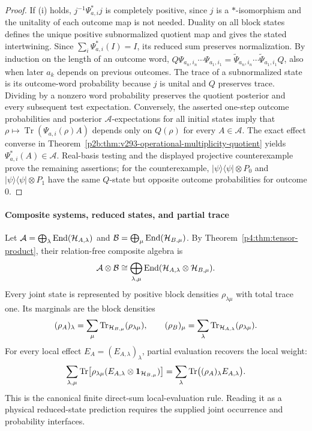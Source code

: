 \documentclass[12pt,a4paper]{article}
\begin{document}
\begin{proof}
If (i) holds, $j^{-1}\Psi_{a,i}^*j$ is completely positive, since
$j$ is a $*$-isomorphism and the unitality of each outcome map is not
needed. Duality on all block states defines the unique positive
subnormalized quotient map and gives the stated intertwining. Since
$\sum_i\Psi_{a,i}^*(I)=I$, its reduced sum preserves normalization.
By induction on the length of an outcome word,
$Q\Psi_{a_n,i_n}\cdots\Psi_{a_1,i_1}
=\widetilde\Psi_{a_n,i_n}\cdots\widetilde\Psi_{a_1,i_1}Q$,
also when later $a_k$ depends on previous outcomes. The trace of a
subnormalized state is its outcome-word probability because $j$ is
unital and $Q$ preserves trace. Dividing by a nonzero word probability
preserves the quotient posterior and every subsequent test expectation.
Conversely, the asserted one-step outcome probabilities and posterior
$\mathcal A$-expectations for all initial states imply that
$\rho\mapsto\operatorname{Tr}(\Psi_{a,i}(\rho)A)$ depends only on
$Q(\rho)$ for every $A\in\mathcal A$. The exact effect converse in
Theorem~\ref{p2b:thm:v293-operational-multiplicity-quotient} yields
$\Psi_{a,i}^*(A)\in\mathcal A$. Real-basis testing and the displayed
projective counterexample prove the remaining assertions; for the
counterexample, $|\psi\rangle\langle\psi|\otimes P_0$ and
$|\psi\rangle\langle\psi|\otimes P_1$ have the same $Q$-state but
opposite outcome probabilities for outcome $0$.
\end{proof}



\paragraph{Composite systems, reduced states, and partial trace}
\label{p4:sec:part1-partial-trace}

Let
\(\mathcal A=\bigoplus_\lambda\operatorname{End}(\mathcal H_{A,\lambda})\) and
\(\mathcal B=\bigoplus_\mu\operatorname{End}(\mathcal H_{B,\mu})\).  By
Theorem~\ref{p4:thm:tensor-product}, their relation-free composite algebra is
\[
\mathcal A\otimes\mathcal B
\cong
\bigoplus_{\lambda,\mu}
\operatorname{End}(\mathcal H_{A,\lambda}\otimes\mathcal H_{B,\mu}).
\]
Every joint state is represented by positive block densities
\(\rho_{\lambda\mu}\) with total trace one.  Its marginals are the block
densities
\begin{equation}
\label{p4:eq:partial-trace}
 (\rho_A)_\lambda
=\sum_\mu\operatorname{Tr}_{\mathcal H_{B,\mu}}(\rho_{\lambda\mu}),
\qquad
 (\rho_B)_\mu
=\sum_\lambda\operatorname{Tr}_{\mathcal H_{A,\lambda}}(\rho_{\lambda\mu}).
\end{equation}
For every local effect \(E_A=(E_{A,\lambda})_\lambda\), partial evaluation
recovers the local weight:
\begin{equation}
\label{p4:eq:local-prob}
\sum_{\lambda,\mu}\operatorname{Tr}\!\left[
\rho_{\lambda\mu}
(E_{A,\lambda}\otimes\mathbf{1}_{\mathcal H_{B,\mu}})
\right]
=\sum_\lambda\operatorname{Tr}\bigl((\rho_A)_\lambda E_{A,\lambda}\bigr).
\end{equation}
This is the canonical finite direct-sum local-evaluation rule.  Reading it as
a physical reduced-state prediction requires the supplied joint occurrence
and probability interfaces.
\end{document}

